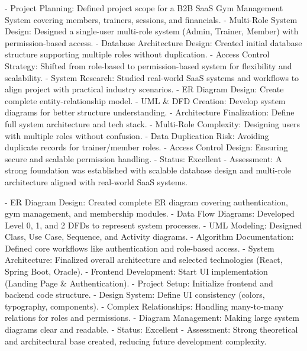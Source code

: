 \documentclass[
  12pt,
  a4paperpaper,
]{report}
\begin{document}
%
{- Project Planning: Defined project scope for a B2B SaaS Gym Management System covering members, trainers, sessions, and financials.\newline
- Multi-Role System Design: Designed a single-user multi-role system (Admin, Trainer, Member) with permission-based access.\newline
- Database Architecture Design: Created initial database structure supporting multiple roles without duplication.\newline
- Access Control Strategy: Shifted from role-based to permission-based system for flexibility and scalability.\newline
- System Research: Studied real-world SaaS systems and workflows to align project with practical industry scenarios.}%
{- ER Diagram Design: Create complete entity-relationship model.\newline
- UML \& DFD Creation: Develop system diagrams for better structure understanding.\newline
- Architecture Finalization: Define full system architecture and tech stack.}%
{- Multi-Role Complexity: Designing users with multiple roles without confusion.\newline
- Data Duplication Risk: Avoiding duplicate records for trainer/member roles.\newline
- Access Control Design: Ensuring secure and scalable permission handling.}%
{- Status: Excellent\newline
- Assessment: A strong foundation was established with scalable database design and multi-role architecture aligned with real-world SaaS systems.}

%
{- ER Diagram Design: Created complete ER diagram covering authentication, gym management, and membership modules.\newline
- Data Flow Diagrams: Developed Level 0, 1, and 2 DFDs to represent system processes.\newline
- UML Modeling: Designed Class, Use Case, Sequence, and Activity diagrams.\newline
- Algorithm Documentation: Defined core workflows like authentication and role-based access.\newline
- System Architecture: Finalized overall architecture and selected technologies (React, Spring Boot, Oracle).}%
{- Frontend Development: Start UI implementation (Landing Page \& Authentication).\newline
- Project Setup: Initialize frontend and backend code structure.\newline
- Design System: Define UI consistency (colors, typography, components).}%
{- Complex Relationships: Handling many-to-many relations for roles and permissions.\newline
- Diagram Management: Making large system diagrams clear and readable.}%
{- Status: Excellent\newline
- Assessment: Strong theoretical and architectural base created, reducing future development complexity.}
\end{document}
